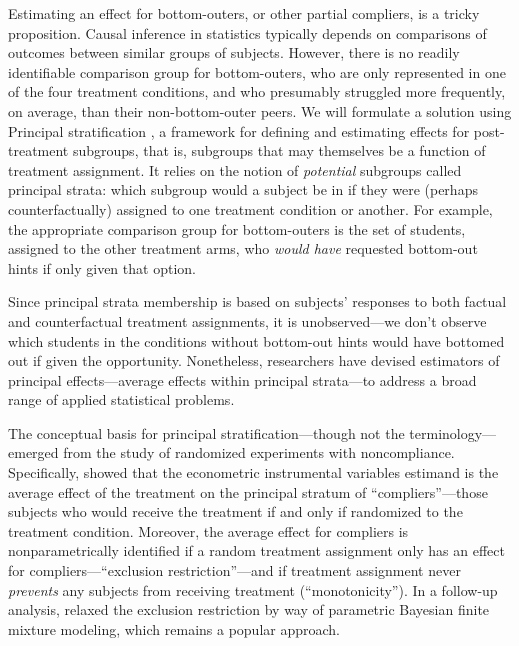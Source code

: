 \documentclass[]{article}
\begin{document}
Estimating an effect for bottom-outers, or other partial compliers, is a tricky proposition.
Causal inference in statistics typically depends on comparisons of outcomes between similar groups of subjects. However, there is no readily identifiable comparison group for bottom-outers, who are only represented in one of the four treatment conditions, and who presumably struggled more frequently, on average, than their non-bottom-outer peers.
We will formulate a solution using Principal stratification \citep{frangakis}, a framework for defining and estimating effects for post-treatment subgroups, that is, subgroups that may themselves be a function of treatment assignment. It relies on the notion of \emph{potential} subgroups called principal strata: which subgroup would a subject be in if they were (perhaps counterfactually) assigned to one treatment condition or another.
For example, the appropriate comparison group for bottom-outers is the set of students, assigned to the other treatment arms, who \emph{would have} requested bottom-out hints if only given that option.

Since principal strata membership is based on subjects' responses to both factual and counterfactual treatment assignments, it is unobserved---we don't observe which students in the conditions without bottom-out hints would have bottomed out if given the opportunity.
Nonetheless, researchers have devised estimators of principal effects---average effects within principal strata---to address a broad range of applied statistical problems.

\label{background}The conceptual basis for principal stratification---though not the terminology---emerged from the study of randomized experiments with noncompliance. Specifically, \citet{air} showed that the econometric instrumental variables estimand is the average effect of the treatment on the principal stratum of ``compliers''---those subjects who would receive the treatment if and only if randomized to the treatment condition. Moreover, the average effect for compliers is nonparametrically identified if a random treatment assignment only has an effect for compliers---``exclusion restriction''---and if treatment assignment never \emph{prevents} any subjects from receiving treatment (``monotonicity'').
In a follow-up analysis, \citet{imbens1997bayesian} relaxed the exclusion restriction by way of parametric Bayesian finite mixture modeling, which remains a popular approach.
\end{document}
